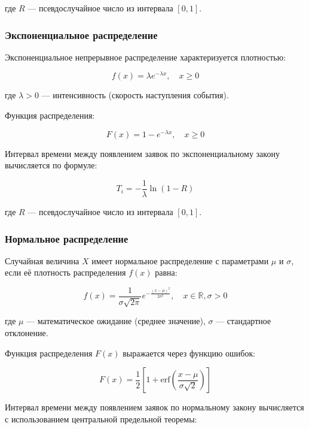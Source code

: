 где $R$ — псевдослучайное число из интервала $[0, 1]$.

\subsubsection{Экспоненциальное распределение}

Экспоненциальное непрерывное распределение характеризуется плотностью:

\begin{equation}
f(x) = \lambda e^{-\lambda x}, \quad x \geq 0
\end{equation}

где $\lambda > 0$ — интенсивность (скорость наступления события).

Функция распределения:

\begin{equation}
F(x) = 1 - e^{-\lambda x}, \quad x \geq 0
\end{equation}

Интервал времени между появлением заявок по экспоненциальному закону вычисляется по формуле:

\begin{equation}
T_i = -\frac{1}{\lambda} \ln(1 - R)
\end{equation}

где $R$ — псевдослучайное число из интервала $[0, 1]$.

\subsubsection{Нормальное распределение}

Случайная величина $X$ имеет нормальное распределение с параметрами $\mu$ и $\sigma$, если её плотность распределения $f(x)$ равна:

\begin{equation}
f(x) = \frac{1}{\sigma\sqrt{2\pi}} e^{-\frac{(x-\mu)^2}{2\sigma^2}}, \quad x \in \mathbb{R}, \sigma > 0
\end{equation}

где $\mu$ — математическое ожидание (среднее значение), $\sigma$ — стандартное отклонение.

Функция распределения $F(x)$ выражается через функцию ошибок:

\begin{equation}
F(x) = \frac{1}{2}\left[1 + \text{erf}\left(\frac{x-\mu}{\sigma\sqrt{2}}\right)\right]
\end{equation}

Интервал времени между появлением заявок по нормальному закону вычисляется с использованием центральной предельной теоремы:

